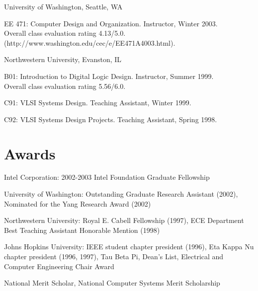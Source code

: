 \documentclass[line]{res}
\newenvironment{list1}{
  \begin{list}{\ding{113}}{%
      \setlength{\itemsep}{0in}
      \setlength{\parsep}{0in} \setlength{\parskip}{0in}
      \setlength{\topsep}{0in} \setlength{\partopsep}{0in} 
      \setlength{\leftmargin}{0.17in}}}{\end{list}}
\begin{document}
\begin{resume}
	University of Washington, Seattle, WA\\
	\vspace{-.1in} 
	\begin{list1}
		\item[] EE 471: Computer Design and Organization. Instructor, Winter 2003.\\
		Overall class evaluation rating 4.13/5.0.\\
		(http://www.washington.edu/cec/e/EE471A4003.html). 
	\end{list1}
	
	Northwestern University, Evanston, IL\\
	\vspace{-.1in} 
	\begin{list1}
		\item[] B01: Introduction to Digital Logic Design. Instructor, Summer 1999.\\
		Overall class evaluation rating 5.56/6.0. 
		\item[] C91: VLSI Systems Design. Teaching Assistant, Winter 1999. 
		\item[] C92: VLSI Systems Design Projects. Teaching Assistant, Spring 1998. 
	\end{list1}
	
	\section{\sc Awards} 
	
	Intel Corporation: 2002-2003 Intel Foundation Graduate Fellowship
	
	University of Washington: Outstanding Graduate Research Assistant (2002), Nominated for the Yang Research Award (2002)
	
	Northwestern University: Royal E. Cabell Fellowship (1997), ECE Department Best Teaching Assistant Honorable Mention (1998)
	
	Johns Hopkins University: IEEE student chapter president (1996), Eta Kappa Nu chapter president (1996, 1997), Tau Beta Pi, Dean's List, Electrical and Computer Engineering Chair Award
	
	National Merit Scholar, National Computer Systems Merit Scholarship
	
\end{resume}
\end{document}
